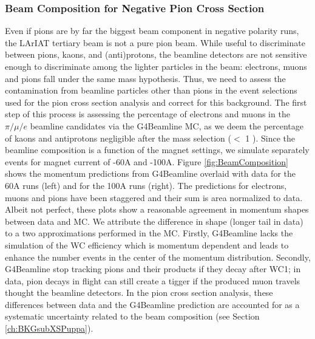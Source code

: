 \subsubsection{Beam Composition for Negative Pion Cross Section}
Even if pions are by far the biggest beam component in negative polarity runs, the LArIAT tertiary beam is not a pure pion beam. While useful to discriminate between pions, kaons, and (anti)protons, the beamline detectors are not sensitive enough to  discriminate among the lighter particles in the beam: electrons, muons and pions fall under the same mass hypothesis. Thus, we need to assess the contamination from beamline particles other than pions in the event selections used for the pion cross section analysis and correct for this background. The first step of this process is assessing the percentage of electrons and muons in the $\pi/\mu/e$ beamline candidates via the G4Beamline MC, as we deem the percentage of kaons and antiprotons negligible after the mass selection ($<$ 1 \textperthousand). 
Since the beamline composition is a function of the magnet settings, we simulate separately events for magnet current of -60A and -100A. 
Figure \ref{fig:BeamComposition} shows the momentum predictions from G4Beamline overlaid with data for the 60A runs (left) and for the 100A runs (right). The predictions for electrons, muons and pions have been staggered and their sum is area normalized to data. Albeit not perfect, these plots show a reasonable agreement in momentum shapes between data and MC.  We attribute the difference in shape (longer tail in data) to a two approximations performed in the MC. Firstly, G4Beamline lacks the simulation of the WC efficiency which is momentum dependent and leads to enhance the number events in the center of the momentum distribution. Secondly, G4Beamline stop tracking pions and their products if they decay after WC1; in data, pion decays in flight can still create a tigger if the produced muon travels thought the beamline detectors. In the pion cross section analysis, these differences between data and the G4Beamline prediction are accounted for as a systematic uncertainty related to the beam composition (see Section \ref{ch:BKGsubXSPuppa}).



